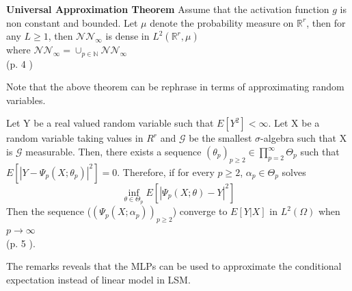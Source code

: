 \begin{theorem}\label{UniversalApproxTheorem}
\textbf{Universal Approximation Theorem} Assume that the activation function $g$ is non constant and bounded. Let $\mu$ denote the probability measure on $\mathbb{R}^r$, then for any $L\geq 1$, then $\mathcal{N} \mathcal{N}_\infty$ is dense in $L^2(\mathbb{R}^r, \mu)$\\
where $\mathcal{N} \mathcal{N}_\infty= \cup_{p\in \mathbb{N}} \mathcal{N} \mathcal{N}_\infty$\\
\null \hfill (p. 4 \parencite{Lelong19})
\end{theorem}
Note that the above theorem can be rephrase in terms of approximating random variables.
\begin{remark}
Let Y be a real valued random variable such that $E[Y^2]< \infty$. Let X be a random variable taking values in $R^r$ and $\mathcal{G}$ be the smallest $\sigma$-algebra such that X is $\mathcal{G}$ measurable. Then, there exists a sequence $(\theta_p)_{p\geq 2} \in \prod_{p=2}^{\infty} \Theta_{p}$ such that $E[|Y-\Psi_p(X;\theta_p)|^2]=0$. Therefore, if for every $p \geq 2$, $\alpha_p \in \Theta_p$ solves
$$\inf_{\theta\in \Theta_p} E[|\Psi_p(X;\theta)-Y|^2]$$
Then the sequence ($(\Psi_p(X;\alpha_p))_{p\geq 2}$) converge to $E[Y|X]$ in $L^2(\Omega)$ when $p \to \infty$ \\
\null \hfill (p. 5 \parencite{Lelong19}).
\end{remark}
The remarks reveals that the MLPs can be used to approximate the conditional expectation instead of linear model in LSM.


